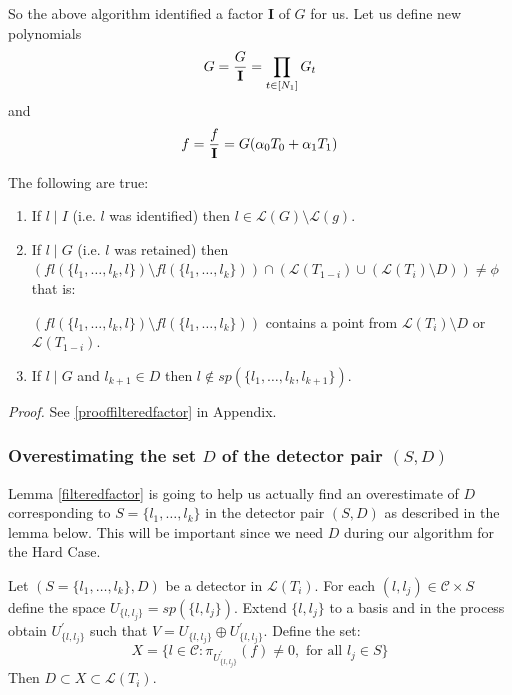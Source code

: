 \documentclass[letterpaper,USenglish,numberwithinsect]{lipics}
\newcommand{\ML}{\mathcal{L}}
\newcommand{\MC}{\mathcal{C}}
\begin{document}
So the above algorithm identified a factor {\bf I} of $G$  for us. Let us define new polynomials
\[
 G = \frac{G}{{\bf I}} = \prod\limits_{t\in [N_1]}G_t
\]
and
\[
f = \frac{f}{{\bf I}} = G (\alpha_0T_0 + \alpha_1T_1)
\]




\begin{lemma}\label{filteredfactor}
The following are true:
\begin{enumerate}
\item If $l\mid I$ (i.e. $l$ was identified) then $l\in \ML(G)\setminus
\ML(g) $.
\item \label{retainedfactor}If $l\mid G$ (i.e. $l$ was retained) then
$(fl(\{l_{1},\ldots,l_{k},l\})\setminus fl(\{l_{1},\ldots,l_{k}\})) \cap
(\ML(T_{1-i})\cup (\ML(T_i)\setminus D)) \neq \phi $ that is:

$(fl(\{l_{1},\ldots,l_{k},l\})\setminus fl(\{l_{1},\ldots,l_{k}\}))$ contains
a point from $\ML(T_i)\setminus D$ or $\ML(T_{1-i})$.

\item \label{retaineddetector} If $l\mid G$ and $l_{k+1}\in D$ then
$l \notin sp(\{l_{1},\ldots,l_{k},l_{k+1}\})$.
    \end{enumerate}
\end{lemma}

\emph{Proof.}
See \ref{prooffilteredfactor} in Appendix.



\subsubsection{Overestimating the set $D$ of the detector pair $(S,D)$}

Lemma \ref{filteredfactor} is
going to help us actually find an overestimate of $D$ corresponding to
$S=\{l_{1},\ldots,l_{k}\}$ in the detector pair $(S,D)$ as described in the lemma
below. This will be important since we need $D$ during our algorithm for the Hard Case.



\begin{lemma} \label{detectorexpansion}
Let $(S=\{l_{1},\ldots,l_{k}\},D)$ be a detector in $\ML(T_i)$. For each
$(l,l_j) \in \MC \times S$ define the space $U_{\{l,l_j\}} = sp(\{l,l_j\})$.
Extend $\{l,l_j\}$ to a basis and in the process obtain $U_{\{l,l_j\}}^\prime$
such that $V = U_{\{l,l_j\}}\oplus U_{\{l,l_j\}}^\prime$. Define the set:
\[
 X = \{l\in \MC : \pi_{U^\prime_{\{l,l_j\}}}(f) \neq 0, \text{  for all }
l_j\in S\}
\]
Then $D\subset X\subset \ML(T_i)$.
\end{lemma}
\end{document}
